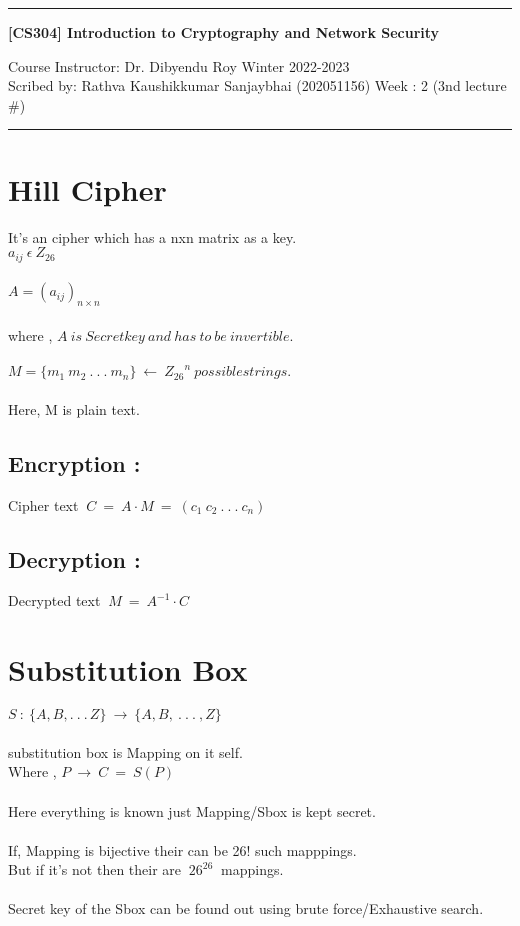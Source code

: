 \documentclass[11pt]{article}
\begin{document}

\noindent
\rule{\textwidth}{1pt}
\begin{center}
{\bf [CS304] Introduction to Cryptography and Network Security}
\end{center}
Course Instructor: Dr. Dibyendu Roy \hfill Winter 2022-2023\\
Scribed by: Rathva Kaushikkumar Sanjaybhai (202051156) \hfill Week : 2 (3nd lecture \#)
\\
\rule{\textwidth}{1pt}

\section{Hill Cipher}
It's an cipher which has a nxn matrix as a key.\\

$a_{ij}\ \epsilon \  Z_{26} $\\\\
$A = (a_{ij})_{n\times n}$ \\\\
where , $ A\ is\ Secret key\ and\ has\ to\ be\ invertible.$\\\\
$M = \{m_1\ m_2\ .\ .\ .\ m_n\}\ \leftarrow \ {Z_{26}}^n\ possible strings. $\\\\
Here, M is plain text.
\subsection{Encryption :}
Cipher text $\ C\ =\ A \cdot M\ =\ (c_1\ c_2\ .\ .\ .\ c_n)$
\subsection{Decryption :}
Decrypted text $\ M\ =\ A^{-1}\cdot C$
\section{Substitution Box}
$S\ :\ \{A,B,.\ .\ .\,Z\}\ \rightarrow \ \{A,B,\ .\ .\ .\ ,Z\}$ \\\\
substitution box is Mapping on it self.\\
Where , $ P\ \rightarrow \ C\ =\ S(P) \ $\\\\
Here everything is known just Mapping/Sbox is kept secret.\\\\
If, Mapping is bijective their can be 26! such mapppings.\\
But if it's not then their are $\ 26^{26}\ $ mappings.\\\\
Secret key of the Sbox can be found out using brute force/Exhaustive search.
\end{document}

